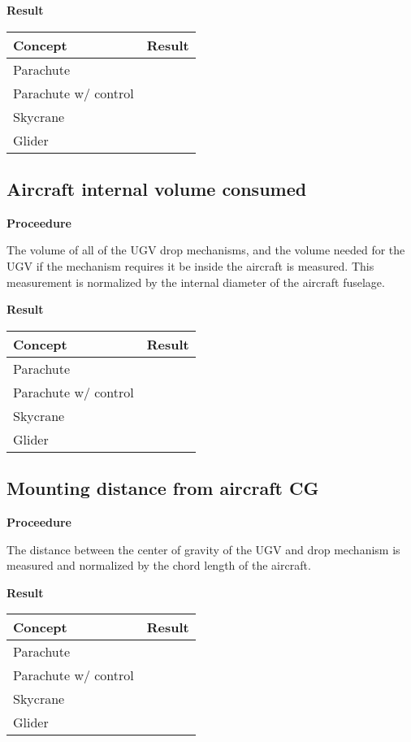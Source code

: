 \documentclass[]{auvsi_doc}
\begin{document}
	\textbf{Result}


	\begin{tabular}{|l|l|}
		\hline
		\textbf{Concept}       & \textbf{Result} \\
		\hline
		Parachute              &                 \\
		Parachute w/ control   &                 \\
		Skycrane               &                 \\
		Glider                 & 			 \\
		\hline
	\end{tabular}

	\subsection{Aircraft internal volume consumed}
	\textbf{Proceedure}

	The volume of all of the UGV drop mechanisms, and the volume needed for the UGV if the mechanism requires it be inside the aircraft is measured. This measurement is normalized by the internal diameter of the aircraft fuselage.

	\textbf{Result}


	\begin{tabular}{|l|l|}
		\hline
		\textbf{Concept}       & \textbf{Result} \\
		\hline
		Parachute              &                 \\
		Parachute w/ control   &                 \\
		Skycrane               &                 \\
		Glider                 & 			 \\
		\hline
	\end{tabular}

	\subsection{Mounting distance from aircraft CG}
	\textbf{Proceedure}

	The distance between the center of gravity of the UGV and drop mechanism is measured and normalized by the chord length of the aircraft.

	\textbf{Result}


	\begin{tabular}{|l|l|}
		\hline
		\textbf{Concept}       & \textbf{Result} \\
		\hline
		Parachute              &                 \\
		Parachute w/ control   &                 \\
		Skycrane               &                 \\
		Glider                 &				 \\
		\hline
	\end{tabular}
\end{document}
